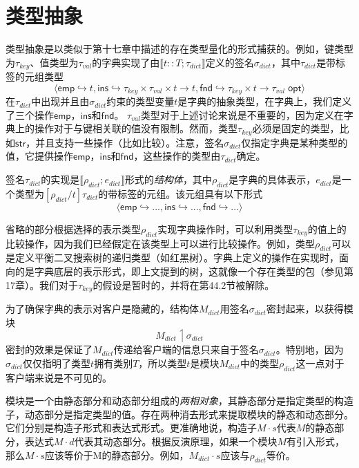 \section{类型抽象}

类型抽象是以类似于第十七章中描述的存在类型量化的形式捕获的。例如，键类型为$\tau_{key}$、值类型为$\tau_{val}$的字典实现了由$\llbracket t::T;\tau_{dict}\rrbracket$定义的签名$\sigma_{dict}$，其中$\tau_{dict}$是带标签的元组类型$$\langle \mathsf{emp} \hookrightarrow t,\mathsf{ins} \hookrightarrow \tau_{key} \times \tau_{val} \times t \rightarrow t, \mathsf{fnd} \hookrightarrow \tau_{key} \times t \rightarrow \tau_{val}\; \mathsf{opt} \rangle$$在$\tau_{dict}$中出现并且由$\sigma_{dict}$约束的类型变量$t$是字典的抽象类型，在字典上，我们定义了三个操作$\mathsf{emp}$，$\mathsf{ins}$和$\mathsf{fnd}$。 $\tau_{val}$类型对于上述讨论来说是不重要的，因为定义在字典上的操作对于与键相关联的值没有限制。然而，类型$\tau_{key}$必须是固定的类型，比如$\mathsf{str}$，并且支持一些操作（比如比较）。注意，签名$\sigma_{dict}$仅指定字典是某种类型的值，它提供操作$\mathsf{emp}$，$\mathsf{ins}$和$\mathsf{fnd}$，这些操作的类型由$\tau_{dict}$确定。

签名$\tau_{dict}$的实现是$\llbracket\rho_{dict};e_{dict}\rrbracket$形式的\textit{结构体}，其中$\rho_{dict}$是字典的具体表示，$e_{dict}$是一个类型为$[\rho_{dict}/t]\tau_{dict}$的带标签的元组。该元组具有以下形式$$\langle \mathsf{emp} \hookrightarrow ... ,\mathsf{ins} \hookrightarrow ... ,\mathsf{fnd}	 \hookrightarrow ... \rangle$$

省略的部分根据选择的表示类型$\rho_{dict}$实现字典操作时，可以利用类型$\tau_{key}$的值上的比较操作，因为我们已经假定在该类型上可以进行比较操作。例如，类型$\rho_{dict}$可以是定义平衡二叉搜索树的递归类型（如红黑树）。字典上定义的操作在实现时，面向的是字典底层的表示形式，即上文提到的树，这就像一个存在类型的包（参见第17章）。我们对于$\tau_{key}$的假设是暂时的，并将在第44.2节被解除。

为了确保字典的表示对客户是隐藏的，结构体$M_{dict}$用签名$\sigma_{dict}$密封起来，以获得模块$$M_{dict} \upharpoonleft \sigma_{dict}$$密封的效果是保证了$M_{dict}$传递给客户端的信息只来自于签名$\sigma_{dict}$。特别地，因为$\sigma_{dict}$仅仅指明了类型$t$拥有类别$T$，所以类型$t$是模块$M_{dict}$中的类型$\rho_{dict}$这一点对于客户端来说是不可见的。

模块是一个由静态部分和动态部分组成的\textit{两相对象}，其静态部分是指定类型的构造子，动态部分是指定类型的值。存在两种消去形式来提取模块的静态和动态部分。它们分别是构造子形式和表达式形式。更准确地说，构造子$M \cdot s$代表$M$的静态部分，表达式$M \cdot d$代表其动态部分。根据反演原理，如果一个模块$M$有引入形式，那么$M \cdot s$应该等价于M的静态部分。例如，$M_{dict} \cdot s$应该与$\rho_{dict}$等价。


